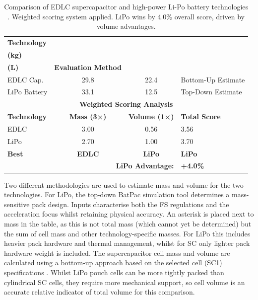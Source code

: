 \documentclass[11pt, a4paper]{report}
\numberwithin{equation}{section}
\begin{document}
\begin{table}[htbp]
    \centering
    \caption{Comparison of EDLC supercapacitor and high-power Li-Po battery technologies \cite{batpac2022manual}. Weighted scoring system applied. LiPo wins by 4.0\% overall score, driven by volume advantages.}
    \label{tab:tech_comparison}
    \footnotesize
    \begin{tabular}{|l|c|c|l|}
        \hline
        \textbf{Technology} & \makecell{\textbf{Mass*} \\ \textbf{(kg)}} & \makecell{\textbf{Cell Volume} \\ \textbf{(L)}} & \textbf{Evaluation Method} \\
        \hline
        EDLC Cap. & 29.8 & 22.4 & Bottom-Up Estimate \\
        \arrayrulecolor{gray!30}\hline\arrayrulecolor{black}
        LiPo Battery & 33.1 & 12.5 & Top-Down Estimate \\
        \hline
        \hline
        \multicolumn{4}{|c|}{\textbf{Weighted Scoring Analysis}} \\
        \hline
        \textbf{Technology} & \textbf{Mass (3×)} & \textbf{Volume (1×)} & \textbf{Total Score} \\
        \hline
        EDLC & 3.00 & 0.56 & 3.56 \\
        \arrayrulecolor{gray!30}\hline\arrayrulecolor{black}
        LiPo & 2.70 & 1.00 & 3.70 \\
        \hline
        \textbf{Best} & \textbf{EDLC} & \textbf{LiPo} & \cellcolor{green!20}\textbf{LiPo} \\
        \hline
        \multicolumn{3}{|r|}{\textbf{LiPo Advantage:}} & \textbf{+4.0\%} \\
        \hline
    \end{tabular}
\end{table}

Two different methodologies are used to estimate mass and volume for the two technologies. For LiPo, the top-down BatPac simulation tool \cite{batpac2022manual} determines a mass-sensitive pack design. Inputs characterise both the FS regulations and the acceleration focus whilst retaining physical accuracy. An asterisk is placed next to mass in the table, as this is not total mass (which cannot yet be determined) but the sum of cell mass and other technology-specific masses. For LiPo this includes heavier pack hardware and thermal management, whilst for SC only lighter pack hardware weight is included. The supercapacitor cell mass and volume are calculated using a bottom-up approach based on the selected cell (SC1) specifications \cite{sech-c46w-3r0-0600}. Whilst LiPo pouch cells can be more tightly packed than cylindrical SC cells, they require more mechanical support, so cell volume is an accurate relative indicator of total volume for this comparison.
\end{document}
